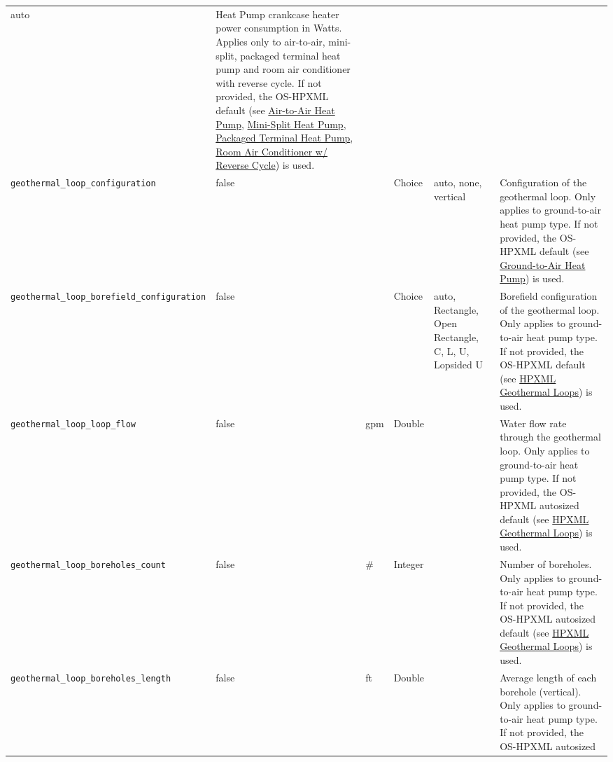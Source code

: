 \begin{longtable}[]{@{}llllll@{}}
auto & Heat Pump crankcase heater power consumption in Watts. Applies
only to air-to-air, mini-split, packaged terminal heat pump and room air
conditioner with reverse cycle. If not provided, the OS-HPXML default
(see
\href{https://openstudio-hpxml.readthedocs.io/en/v1.7.0/workflow_inputs.html\#air-to-air-heat-pump}{Air-to-Air
Heat Pump},
\href{https://openstudio-hpxml.readthedocs.io/en/v1.7.0/workflow_inputs.html\#mini-split-heat-pump}{Mini-Split
Heat Pump},
\href{https://openstudio-hpxml.readthedocs.io/en/v1.7.0/workflow_inputs.html\#packaged-terminal-heat-pump}{Packaged
Terminal Heat Pump},
\href{https://openstudio-hpxml.readthedocs.io/en/v1.7.0/workflow_inputs.html\#room-air-conditioner-w-reverse-cycle}{Room
Air Conditioner w/ Reverse Cycle}) is used. \\
\texttt{geothermal\_loop\_configuration} & false & & Choice & auto,
none, vertical & Configuration of the geothermal loop. Only applies to
ground-to-air heat pump type. If not provided, the OS-HPXML default (see
\href{https://openstudio-hpxml.readthedocs.io/en/v1.7.0/workflow_inputs.html\#ground-to-air-heat-pump}{Ground-to-Air
Heat Pump}) is used. \\
\texttt{geothermal\_loop\_borefield\_configuration} & false & & Choice &
auto, Rectangle, Open Rectangle, C, L, U, Lopsided U & Borefield
configuration of the geothermal loop. Only applies to ground-to-air heat
pump type. If not provided, the OS-HPXML default (see
\href{https://openstudio-hpxml.readthedocs.io/en/v1.7.0/workflow_inputs.html\#hpxml-geothermal-loops}{HPXML
Geothermal Loops}) is used. \\
\texttt{geothermal\_loop\_loop\_flow} & false & gpm & Double & & Water
flow rate through the geothermal loop. Only applies to ground-to-air
heat pump type. If not provided, the OS-HPXML autosized default (see
\href{https://openstudio-hpxml.readthedocs.io/en/v1.7.0/workflow_inputs.html\#hpxml-geothermal-loops}{HPXML
Geothermal Loops}) is used. \\
\texttt{geothermal\_loop\_boreholes\_count} & false & \# & Integer & &
Number of boreholes. Only applies to ground-to-air heat pump type. If
not provided, the OS-HPXML autosized default (see
\href{https://openstudio-hpxml.readthedocs.io/en/v1.7.0/workflow_inputs.html\#hpxml-geothermal-loops}{HPXML
Geothermal Loops}) is used. \\
\texttt{geothermal\_loop\_boreholes\_length} & false & ft & Double & &
Average length of each borehole (vertical). Only applies to
ground-to-air heat pump type. If not provided, the OS-HPXML autosized

\end{longtable}
